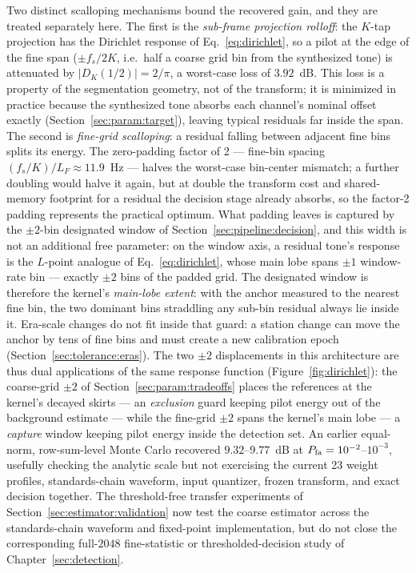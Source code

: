 Two distinct scalloping mechanisms bound the recovered gain, and they are treated separately here. The first is the \emph{sub-frame projection rolloff}: the $K$-tap projection has the Dirichlet response of Eq.~\eqref{eq:dirichlet}, so a pilot at the edge of the fine span ($\pm f_s/2K$, i.e.\ half a coarse grid bin from the synthesized tone) is attenuated by $|D_K(1/2)| = 2/\pi$, a worst-case loss of $3.92$~dB. This loss is a property of the segmentation geometry, not of the transform; it is minimized in practice because the synthesized tone absorbs each channel's nominal offset exactly (Section~\ref{sec:param:target}), leaving typical residuals far inside the span. The second is \emph{fine-grid scalloping}: a residual falling between adjacent fine bins splits its energy. The zero-padding factor of 2 --- fine-bin spacing $(f_s/K)/L_F \approx 11.9$~Hz --- halves the worst-case bin-center mismatch; a further doubling would halve it again, but at double the transform cost and shared-memory footprint for a residual the decision stage already absorbs, so the factor-2 padding represents the practical optimum. What padding leaves is captured by the $\pm 2$-bin designated window of Section~\ref{sec:pipeline:decision}, and this width is not an additional free parameter: on the window axis, a residual tone's response is the $L$-point analogue of Eq.~\eqref{eq:dirichlet}, whose main lobe spans $\pm 1$ window-rate bin --- exactly $\pm 2$ bins of the padded grid. The designated window is therefore the kernel's \emph{main-lobe extent}: with the anchor measured to the nearest fine bin, the two dominant bins straddling any sub-bin residual always lie inside it.  Era-scale changes do not fit inside that guard: a station change can move the anchor by tens of fine bins and must create a new calibration epoch (Section~\ref{sec:tolerance:eras}). The two $\pm 2$ displacements in this architecture are thus dual applications of the same response function (Figure~\ref{fig:dirichlet}): the coarse-grid $\pm 2$ of Section~\ref{sec:param:tradeoffs} places the references at the kernel's decayed skirts --- an \emph{exclusion} guard keeping pilot energy out of the background estimate --- while the fine-grid $\pm 2$ spans the kernel's main lobe --- a \emph{capture} window keeping pilot energy inside the detection set. An earlier equal-norm, row-sum-level Monte Carlo recovered $9.32$--$9.77$~dB at $P_{\rm fa}=10^{-2}$--$10^{-3}$, usefully checking the analytic scale but not exercising the current 23 weight profiles, standards-chain waveform, input quantizer, frozen transform, and exact decision together. The threshold-free transfer experiments of Section~\ref{sec:estimator:validation} now test the coarse estimator across the standards-chain waveform and fixed-point implementation, but do not close the corresponding full-$2048$ fine-statistic or thresholded-decision study of Chapter~\ref{sec:detection}.

